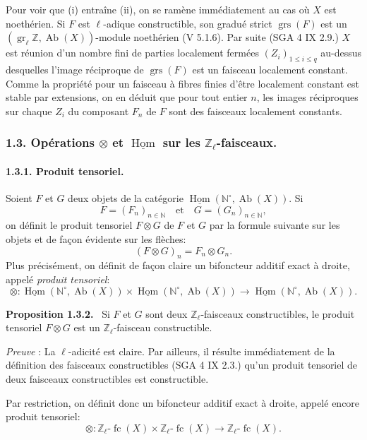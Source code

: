 \documentclass[11pt]{article}
\newenvironment{statement}[1]{\par\medskip\noindent\textbf{#1.}\ }{\par\medskip}
\DeclareMathOperator{\Hom}{Hom}
\providecommand{\uHom}{\underline{\Hom}}
\providecommand{\Hom}{\operatorname{Hom}}
\providecommand{\grs}{\operatorname{grs}}
\providecommand{\Ab}{\operatorname{Ab}}
\providecommand{\fc}{\operatorname{fc}}
\providecommand{\Ab}{\operatorname{Ab}}
\providecommand{\Hom}{\operatorname{Hom}}
\begin{document}
Pour voir que (i) entraîne (ii), on se ramène immédiatement au cas où \(X\) est noethérien. Si \(F\) est \(\ell\)-adique constructible, son gradué strict \(\grs(F)\) est un \((\operatorname{gr}_\ell\mathbb Z,\Ab(X))\)-module noethérien (V 5.1.6). Par suite (SGA 4 IX 2.9.) \(X\) est réunion d'un nombre fini de parties localement fermées \((Z_i)_{1\le i\le q}\) au-dessus desquelles l'image réciproque de \(\grs(F)\) est un faisceau localement constant. Comme la propriété pour un faisceau à fibres finies d'être localement constant est stable par extensions, on en déduit que pour tout entier \(n\), les images réciproques sur chaque \(Z_i\) du composant \(F_n\) de \(F\) sont des faisceaux localement constants.

\subsubsection*{1.3. Opérations \(\otimes\) et \(\uHom\) sur les \(\mathbb Z_\ell\)-faisceaux.}

\paragraph{1.3.1. Produit tensoriel.}
Soient \(F\) et \(G\) deux objets de la catégorie \(\uHom(\mathbb N^\circ,\Ab(X))\). Si
\[
F=(F_n)_{n\in\mathbb N}\quad\text{et}\quad G=(G_n)_{n\in\mathbb N},
\]
on définit le produit tensoriel \(F\otimes G\) de \(F\) et \(G\) par la formule suivante sur les objets et de façon évidente sur les flèches:
\[
(F\otimes G)_n=F_n\otimes G_n.
\]
Plus précisément, on définit de façon claire un bifoncteur additif exact à droite, appelé \emph{produit tensoriel}:
\[
\otimes:\uHom(\mathbb N^\circ,\Ab(X))\times \uHom(\mathbb N^\circ,\Ab(X))
\longrightarrow \uHom(\mathbb N^\circ,\Ab(X)).
\]

\begin{statement}{Proposition 1.3.2}
Si \(F\) et \(G\) sont deux \(\mathbb Z_\ell\)-faisceaux constructibles, le produit tensoriel \(F\otimes G\) est un \(\mathbb Z_\ell\)-faisceau constructible.
\end{statement}

\emph{Preuve} : La \(\ell\)-adicité est claire. Par ailleurs, il résulte immédiatement de la définition des faisceaux constructibles (SGA 4 IX 2.3.) qu'un produit tensoriel de deux faisceaux constructibles est constructible.

Par restriction, on définit donc un bifoncteur additif exact à droite, appelé encore produit tensoriel:
\[
\otimes:\mathbb Z_\ell\text{-}\fc(X)\times \mathbb Z_\ell\text{-}\fc(X)
\longrightarrow \mathbb Z_\ell\text{-}\fc(X).
\]
\end{document}
